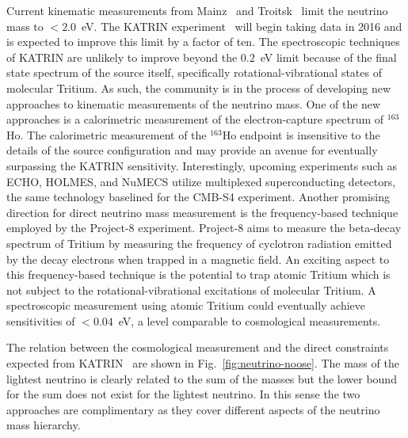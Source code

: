 Current kinematic measurements from Mainz~\cite{Mainz} and Troitsk~\cite{Troitsk} limit the neutrino mass to $< 2.0$~eV. The KATRIN experiment~\cite{angrik} will begin taking data in 2016 and is expected to improve this limit by a factor of ten. The spectroscopic techniques of KATRIN are unlikely to improve beyond the $0.2$~eV limit because of the final state spectrum of the source itself, specifically rotational-vibrational states of molecular Tritium. As such, the community is in the process of developing new approaches to kinematic measurements of the neutrino mass. One of the new approaches is a calorimetric measurement of the electron-capture spectrum of $^{163}$Ho. The calorimetric measurement of the $^{163}$Ho endpoint is insensitive to the details of the source configuration and may provide an avenue for eventually surpassing the KATRIN sensitivity. Interestingly, upcoming experiments such as ECHO, HOLMES, and NuMECS utilize multiplexed superconducting detectors, the same technology baselined for the CMB-S4 experiment. Another promising direction for direct neutrino mass measurement is the frequency-based technique employed by the Project-8 experiment. Project-8 aims to measure the beta-decay spectrum of Tritium by measuring the frequency of cyclotron radiation emitted by the decay electrons when trapped in a magnetic field. An exciting aspect to this frequency-based technique is the potential to trap atomic Tritium which is not subject to the rotational-vibrational excitations of molecular Tritium. A spectroscopic measurement using atomic Tritium could eventually achieve sensitivities of $<0.04$~eV, a level comparable to cosmological measurements.


The relation between the cosmological measurement and the direct constraints expected from KATRIN~\cite{} are shown in Fig.~\ref{fig:neutrino-noose}.  The mass of the lightest neutrino is clearly related to the sum of the masses but the lower bound for the sum does not exist for the lightest neutrino.  In this sense the two approaches are complimentary as they cover different aspects of the neutrino mass hierarchy.

